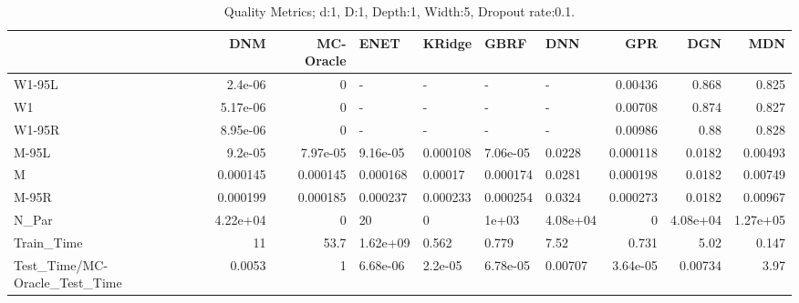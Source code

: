 \begin{table}
\centering
\caption{Quality Metrics; d:1, D:1, Depth:1, Width:5, Dropout rate:0.1.}
\begin{tabular}{lrrllllrrr}
\toprule
{} &      DNM &  MC-Oracle &     ENET &   KRidge &     GBRF &      DNN &      GPR &      DGN &      MDN \\
\midrule
W1-95L                        &  2.4e-06 &          0 &        - &        - &        - &        - &  0.00436 &    0.868 &    0.825 \\
W1                            & 5.17e-06 &          0 &        - &        - &        - &        - &  0.00708 &    0.874 &    0.827 \\
W1-95R                        & 8.95e-06 &          0 &        - &        - &        - &        - &  0.00986 &     0.88 &    0.828 \\
M-95L                         &  9.2e-05 &   7.97e-05 & 9.16e-05 & 0.000108 & 7.06e-05 &   0.0228 & 0.000118 &   0.0182 &  0.00493 \\
M                             & 0.000145 &   0.000145 & 0.000168 &  0.00017 & 0.000174 &   0.0281 & 0.000198 &   0.0182 &  0.00749 \\
M-95R                         & 0.000199 &   0.000185 & 0.000237 & 0.000233 & 0.000254 &   0.0324 & 0.000273 &   0.0182 &  0.00967 \\
N\_Par                         & 4.22e+04 &          0 &       20 &        0 &    1e+03 & 4.08e+04 &        0 & 4.08e+04 & 1.27e+05 \\
Train\_Time                    &       11 &       53.7 & 1.62e+09 &    0.562 &    0.779 &     7.52 &    0.731 &     5.02 &    0.147 \\
Test\_Time/MC-Oracle\_Test\_Time &   0.0053 &          1 & 6.68e-06 &  2.2e-05 & 6.78e-05 &  0.00707 & 3.64e-05 &  0.00734 &     3.97 \\
\bottomrule
\end{tabular}
\end{table}
